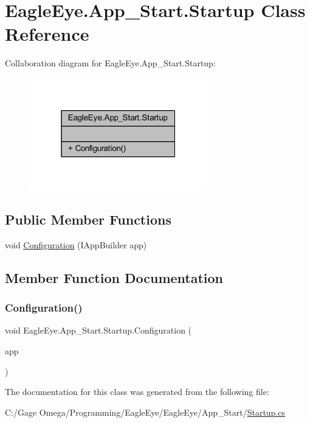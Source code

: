 \hypertarget{class_eagle_eye_1_1_app___start_1_1_startup}{}\section{Eagle\+Eye.\+App\+\_\+\+Start.\+Startup Class Reference}
\label{class_eagle_eye_1_1_app___start_1_1_startup}


Collaboration diagram for Eagle\+Eye.\+App\+\_\+\+Start.\+Startup\+:\nopagebreak
\begin{figure}[H]
\begin{center}
\leavevmode
\includegraphics[width=220pt]{class_eagle_eye_1_1_app___start_1_1_startup__coll__graph}
\end{center}
\end{figure}
\subsection*{Public Member Functions}
\begin{DoxyCompactItemize}
\item 
void \mbox{\hyperlink{class_eagle_eye_1_1_app___start_1_1_startup_a2a01229f769b2fed47ca08c611722e73}{Configuration}} (I\+App\+Builder app)
\end{DoxyCompactItemize}


\subsection{Member Function Documentation}
\mbox{\label{class_eagle_eye_1_1_app___start_1_1_startup_a2a01229f769b2fed47ca08c611722e73}} 
\subsubsection{\texorpdfstring{Configuration()}{Configuration()}}
{\footnotesize\ttfamily void Eagle\+Eye.\+App\+\_\+\+Start.\+Startup.\+Configuration (\begin{DoxyParamCaption}\item[{I\+App\+Builder}]{app }\end{DoxyParamCaption})}



The documentation for this class was generated from the following file\+:\begin{DoxyCompactItemize}
\item 
C\+:/\+Gage Omega/\+Programming/\+Eagle\+Eye/\+Eagle\+Eye/\+App\+\_\+\+Start/\mbox{\hyperlink{_startup_8cs}{Startup.\+cs}}\end{DoxyCompactItemize}
